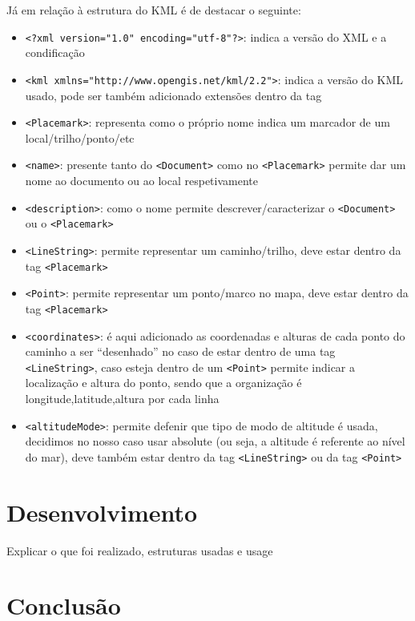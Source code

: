 \documentclass{llncs}
\begin{document}
Já em relação à estrutura do KML é de destacar o seguinte:
\begin{itemize}
    \item \verb|<?xml version="1.0" encoding="utf-8"?>|: indica a versão do XML e a condificação 
    \item \verb|<kml xmlns="http://www.opengis.net/kml/2.2">|: indica a versão do KML usado, pode ser também adicionado extensões dentro da tag
    \item \verb|<Placemark>|: representa como o próprio nome indica um marcador de um local/trilho/ponto/etc
    \item \verb|<name>|: presente tanto do \verb|<Document>| como no \verb|<Placemark>| permite dar um nome ao documento ou ao local respetivamente
    \item \verb|<description>|: como o nome permite descrever/caracterizar o \verb|<Document>| ou o \verb|<Placemark>|
    \item \verb|<LineString>|: permite representar um caminho/trilho, deve estar dentro da tag \verb|<Placemark>|
    \item \verb|<Point>|: permite representar um ponto/marco no mapa, deve estar dentro da tag \verb|<Placemark>|
    \item \verb|<coordinates>|: é aqui adicionado as coordenadas e alturas de cada ponto do caminho a ser ``desenhado'' no caso de estar dentro de uma tag \verb|<LineString>|, caso esteja dentro de um \verb|<Point>| permite indicar a localização e altura do ponto, sendo que a organização é longitude,latitude,altura por cada linha
    \item \verb|<altitudeMode>|: permite defenir que tipo de modo de altitude é usada, decidimos no nosso caso usar absolute (ou seja, a altitude é referente ao nível do mar), deve também estar dentro da tag \verb|<LineString>| ou da tag \verb|<Point>|
\end{itemize}

\section{Desenvolvimento}
Explicar o que foi realizado, estruturas usadas e usage

\section{Conclusão}
\end{document}

